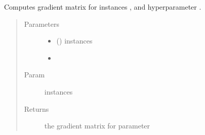 \documentclass[letterpaper,10pt,english]{sphinxmanual}
\begin{document}
\begin{fulllineitems}
\begin{fulllineitems}
\label{\detokenize{index:bo.covfunc.ExpSine.grad_matrix}}
Computes gradient matrix for instances ,  and hyperparameter .
\begin{quote}\begin{description}
\item[{Parameters}] \leavevmode\begin{itemize}
\item {} 
 (\sphinxstyleliteralemphasis{, }\sphinxstyleliteralemphasis{(}\sphinxstyleliteralemphasis{(}\sphinxstyleliteralemphasis{, }\sphinxstyleliteralemphasis{)}\sphinxstyleliteralemphasis{)}) \textendash{} instances

\item {} 
 \textendash{} 

\end{itemize}

\item[{Param}] \leavevmode
instances

\item[{Returns}] \leavevmode
the gradient matrix for parameter 

\end{description}\end{quote}

\end{fulllineitems}


\end{fulllineitems}

\end{document}
